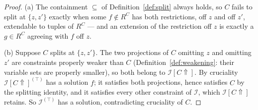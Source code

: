 \begin{proof}
(a) The containment $\subseteq$ of Definition~\ref{def:split} always holds,
so $C$ fails to split at $\{z,z'\}$ exactly when some
$f\notin R^{C}$ has both restrictions, off $z$ and off $z'$, extendable to
tuples of $R^{C}$ --- and an extension of the restriction off $z$ is exactly
a $g\in R^{C}$ agreeing with $f$ off $z$.

(b) Suppose $C$ splits at $\{z,z'\}$. The two projections of $C$ omitting
$z$ and omitting $z'$ are constraints properly weaker than $C$
(Definition~\ref{def:weakening}: their variable sets are properly smaller),
so both belong to $\mathcal I[C\Uparrow]$. By cruciality
$\mathcal I[C\Uparrow]^{(\top)}$ has a solution $f$; it satisfies both
projections, hence satisfies $C$ by the splitting identity, and it
satisfies every other constraint of $\mathcal I$, which
$\mathcal I[C\Uparrow]$ retains. So $\mathcal I^{(\top)}$ has a solution,
contradicting cruciality of $C$.
\end{proof}
